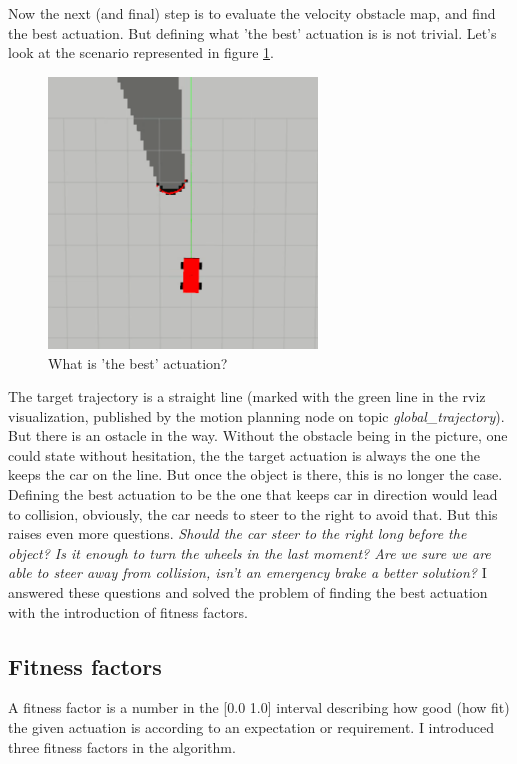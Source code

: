 Now the next (and final) step is to evaluate the velocity obstacle map, and find the best actuation. But defining what 'the best' actuation is is not trivial.
Let's look at the scenario represented in figure \ref{what_is_the_best_actuation}.

\begin{figure}[!ht]
    \centering
    \includegraphics[height=72mm]{figures/raw/rviz_straight_traj_static_object.png}
    \caption{What is 'the best' actuation?}
    \label{what_is_the_best_actuation}
\end{figure}

The target trajectory is a straight line (marked with the green line in the rviz visualization, published by the motion planning node on topic \textit{global\_trajectory}). But there is an ostacle in the way. Without the obstacle being in the picture, one could state without hesitation, the the target actuation is always the one the keeps the car on the line. But once the object is there, this is no longer the case. Defining the best actuation to be the one that keeps car in direction would lead to collision, obviously, the car needs to steer to the right to avoid that. But this raises even more questions. \textit{Should the car steer to the right long before the object? Is it enough to turn the wheels in the last moment? Are we sure we are able to steer away from collision, isn't an emergency brake a better solution?} I answered these questions and solved the problem of finding the best actuation with the introduction of fitness factors.

\subsection{Fitness factors}
A fitness factor is a number in the [0.0 1.0] interval describing how good (how fit) the given actuation is according to an expectation or requirement. I introduced three fitness factors in the algorithm.

